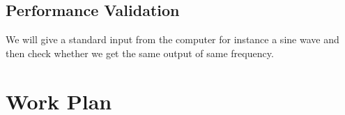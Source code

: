 \documentclass{article}
\begin{document}
\subsection{Performance Validation}
We will give a standard input from the computer for instance a sine wave and then check whether we get the same output of same frequency.

\section{Work Plan}
\end{document}
